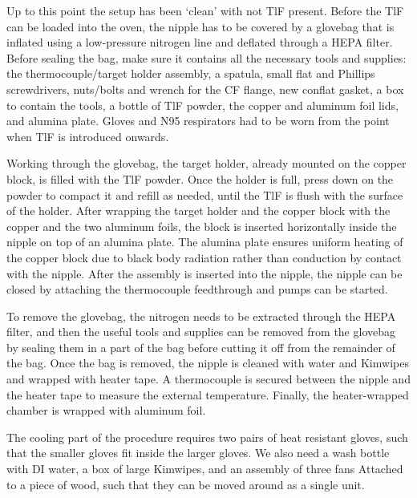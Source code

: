Up to this point the setup has been `clean' with not TlF present. Before the TlF
can be loaded into the oven, the nipple has to be covered by a glovebag that is
inflated using a low-pressure nitrogen line and deflated through a HEPA filter.
Before sealing the bag, make sure it contains all the necessary tools and
supplies: the thermocouple/target holder assembly, a spatula, small flat and
Phillips screwdrivers, nuts/bolts and wrench for the CF flange, new conflat
gasket, a box to contain the tools, a bottle of TlF powder, the copper and
aluminum foil lids, and alumina plate. Gloves and N95 respirators had to be worn
from the point when TlF is introduced onwards.

Working through the glovebag, the target holder, already mounted on the copper
block, is filled with the TlF powder. Once the holder is full, press down on the
powder to compact it and refill as needed, until the TlF is flush with the
surface of the holder. After wrapping the target holder and the copper block
with the copper and the two aluminum foils, the block is inserted horizontally
inside the nipple on top of an alumina plate. The alumina plate ensures uniform
heating of the copper block due to black body radiation rather than conduction
by contact with the nipple. After the assembly is inserted into the nipple, the
nipple can be closed by attaching the thermocouple feedthrough and pumps can be
started.

To remove the glovebag, the nitrogen needs to be extracted through the HEPA
filter, and then the useful tools and supplies can be removed from the glovebag
by sealing them in a part of the bag before cutting it off from the remainder of
the bag. Once the bag is removed, the nipple is cleaned with water and Kimwipes
and wrapped with heater tape. A thermocouple is secured between the nipple and
the heater tape to measure the external temperature. Finally, the heater-wrapped
chamber is wrapped with aluminum foil.

The cooling part of the procedure requires two pairs of heat resistant gloves,
such that the smaller gloves fit inside the larger gloves. We also need a wash
bottle with DI water, a box of large Kimwipes, and an assembly of three fans
Attached to a piece of wood, such that they can be moved around as a single
unit.

